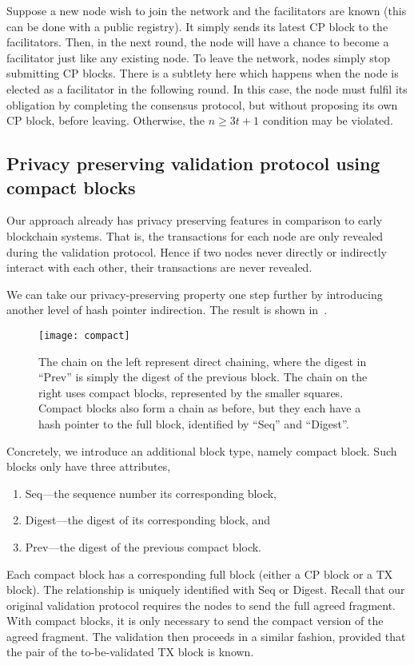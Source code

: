 Suppose a new node wish to join the network and the facilitators are known (this can be done with a public registry).
It simply sends its latest CP block to the facilitators.
Then, in the next round, the node will have a chance to become a facilitator just like any existing node.
To leave the network, nodes simply stop submitting CP blocks.
There is a subtlety here which happens when the node is elected as a facilitator in the following round.
In this case, the node must fulfil its obligation by completing the consensus protocol, but without proposing its own CP block, before leaving.
Otherwise, the $n \ge 3t + 1$ condition may be violated.

\subsection{Privacy preserving validation protocol using compact blocks}
\label{sec:compact}
Our approach already has privacy preserving features in comparison to early blockchain systems.
That is, the transactions for each node are only revealed during the validation protocol.
Hence if two nodes never directly or indirectly interact with each other,
their transactions are never revealed.

We can take our privacy-preserving property one step further by introducing another level of hash pointer indirection.
The result is shown in~.
\begin{figure}
    \texttt{[image: compact]}
    \centering
    \caption{The chain on the left represent direct chaining, where the digest in ``Prev'' is simply the digest of the previous block.
    The chain on the right uses compact blocks, represented by the smaller squares.
    Compact blocks also form a chain as before, but they each have a hash pointer to the full block, identified by ``Seq'' and ``Digest''.}
    \label{fig:compact}
\end{figure}

Concretely, we introduce an additional block type,
namely compact block.
Such blocks only have three attributes,
\begin{enumerate}
\item Seq---the sequence number its corresponding block,
\item Digest---the digest of its corresponding block, and
\item Prev---the digest of the previous compact block.
\end{enumerate}
Each compact block has a corresponding full block (either a CP block or a TX block).
The relationship is uniquely identified with Seq or Digest.
Recall that our original validation protocol requires the nodes to send the full agreed fragment.
With compact blocks, it is only necessary to send the compact version of the agreed fragment.
The validation then proceeds in a similar fashion,
provided that the pair of the to-be-validated TX block is known.

